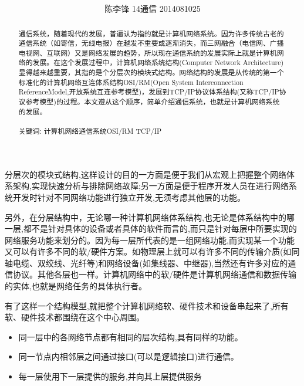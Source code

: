 \documentclass[11pt]{ctexart} %
\title{\centering {\LARGE{通信系统述论}}\\%
} %
\author{\textsc \small{{陈李锋 14通信 2014081025 }} %
} %
\begin{document}
\maketitle %

\begin{abstract} %
通信系统，随着现代的发展，普遍认为指的就是计算机网络系统。因为许多传统古老的通信系统（如寄信，无线电报）在越发不重要或逐渐消失，而三网融合（电信网、广播电视网、互联网）又是网络发展的趋势，所以现在通信系统的发展实际上就是计算机网络的发展。在这个发展过程中，计算机网络系统结构(Computer Network Architecture)显得越来越重要，其指的是个分层次的模块式结构。网络结构的发展是从传统的第一个标准化的计算机网络互连体系结构OSI/RM(Open System Interconnection ReferenceModel,开放系统互连参考模型)，发展到TCP/IP协议体系结构(又称TCP/IP协议参考模型)的过程。本文遵从这个顺序，简单介绍通信系统，也就是计算机网络系统的发展。
\\\\关键词: 计算机网络\quad  通信系统\quad OSI/RM \quad TCP/IP 

\end{abstract}

\subsubsection*{}
\paragraph{}
分层次的模块式结构,这样设计的目的一方面是便于我们从宏观上把握整个网络体系架构,实现快速分析与排除网络故障;另一方面是便于程序开发人员在进行网络系统开发时针对不同网络功能进行独立开发,无须考虑其他层的功能。

另外，在分层结构中，无论哪一种计算机网络体系结构,也无论是体系结构中的哪一层,都不是针对具体的设备或者具体的软件而言的,而只是针对每层中所要实现的网络服务功能来划分的。因为每一层所代表的是一组网络功能,而实现某一个功能又可以有许多不同的软/硬件方案。如物理层上就可以有许多不同的传输介质(如同轴电缆、双绞线、光纤等)和网络设备(如集线器、中继器),当然还有许多对应的通信协议。其他各层也一样。计算机网络中的软/硬件是计算机网络通信和数据传输的实体,也就是网络任务的具体执行者。

有了这样一个结构模型,就把整个计算机网络软、硬件技术和设备串起来了,所有软、硬件技术都围绕在这个中心周围。
\begin{itemize}
\item 同一层中的各网络节点都有相同的层次结构,具有同样的功能。
\item 同一节点内相邻层之间通过接口(可以是逻辑接口)进行通信。
\item 每一层使用下一层提供的服务,并向其上层提供服务
\end{itemize}
\end{document}
